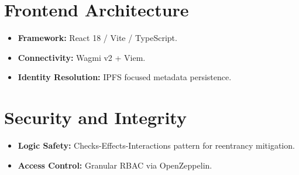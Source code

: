 \documentclass[11pt,a4paper]{article}
\begin{document}
\section{Frontend Architecture}
\begin{itemize}
    \item \textbf{Framework:} React 18 / Vite / TypeScript.
    \item \textbf{Connectivity:} Wagmi v2 + Viem.
    \item \textbf{Identity Resolution:} IPFS focused metadata persistence.
\end{itemize}

\section{Security and Integrity}
\begin{itemize}
    \item \textbf{Logic Safety:} Checks-Effects-Interactions pattern for reentrancy mitigation.
    \item \textbf{Access Control:} Granular RBAC via OpenZeppelin.
\end{itemize}
\end{document}
